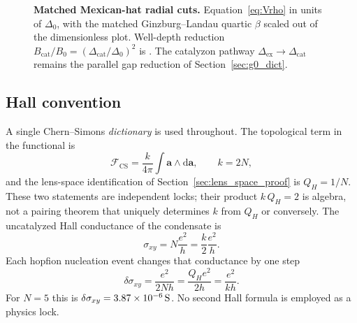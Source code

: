 \begin{figure}[htbp]
\centering
{}
\caption{\textbf{Matched Mexican-hat radial cuts.} Equation~\eqref{eq:Vrho} in units of $\Delta_0$, with the matched Ginzburg--Landau quartic $\beta$ scaled out of the dimensionless plot. Well-depth reduction $B_{\mathrm{cat}}/B_0=(\Delta_{\mathrm{cat}}/\Delta_0)^2$ is \hatbarrier{}. The catalyzon pathway $\Delta_{\mathrm{ex}}\to\Delta_{\mathrm{cat}}$ remains the parallel \pctcat{} gap reduction of Section~\ref{sec:g0_dict}.}
\label{fig:mexican_matched}
\end{figure}

\subsection{Hall convention}
\label{sec:hall_dict}

A single Chern--Simons \emph{dictionary} is used throughout. The topological term in the \TQGL{} functional is
\begin{equation}
\mathcal{F}_{\mathrm{CS}}=\frac{k}{4\pi}\int\mathbf{a}\wedge\mathrm{d}\mathbf{a},\qquad k=2N,
\end{equation}
and the lens-space identification of Section~\ref{sec:lens_space_proof} is $Q_H=1/N$. These two statements are independent locks; their product $k\,Q_H=2$ is algebra, not a pairing theorem that uniquely determines $k$ from $Q_H$ or conversely. The uncatalyzed Hall conductance of the condensate is
\begin{equation}
\sigma_{xy}=N\frac{e^2}{h}=\frac{k}{2}\frac{e^2}{h}.
\end{equation}
Each hopfion nucleation event changes that conductance by one step
\begin{equation}
\delta\sigma_{xy}=\frac{e^2}{2Nh}=\frac{Q_H e^2}{2h}=\frac{e^2}{kh}.
\label{eq:dsigma_lock}
\end{equation}
For $N=5$ this is $\delta\sigma_{xy}=3.87\times 10^{-6}\,\mathrm{S}$. No second Hall formula is employed as a physics lock.

